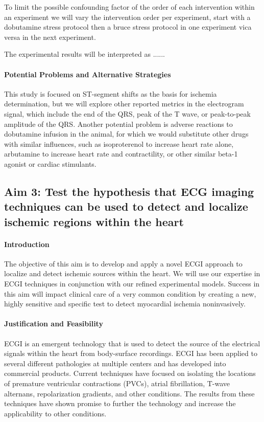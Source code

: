 To limit the possible confounding factor of the order of each intervention within an experiment we will vary the intervention order per experiment, \ie{} start with a dobutamine stress protocol then a bruce stress protocol in one experiment vica versa in the next experiment. 

The experimental results will be interpreted as ...... 


\paragraph{Potential Problems and Alternative Strategies} This study is
focused on ST-segment shifts as the basis for ischemia determination, but
we will explore other reported metrics in the electrogram signal, which
include the end of the QRS, peak of the T wave, or peak-to-peak amplitude
of the QRS. Another potential problem is adverse reactions to dobutamine
infusion in the animal, for which we would substitute other drugs with
similar influences, such as isoproterenol to increase heart rate alone,
arbutamine to increase heart rate and contractility, or other similar
beta-1 agonist or cardiac stimulants.

\subsection{Aim 3: Test the hypothesis that ECG imaging techniques can be used to detect and localize ischemic regions within the heart}

 \paragraph{Introduction} The objective of this aim is to develop and apply a novel ECGI approach to
localize and detect ischemic sources within the heart. We will use our
expertise in ECGI techniques in conjunction with our refined experimental
models. Success in this aim will impact clinical care of a very common
condition by creating a new, highly sensitive and specific test to detect
myocardial ischemia noninvasively.

\paragraph{Justification and Feasibility}
 ECGI is an emergent technology that
 is used to detect the source of the electrical signals within the heart
 from body-surface recordings.
ECGI has been applied to several different pathologies at multiple centers
and has developed into commercial products. Current techniques have focused
on isolating the locations of premature ventricular contractions (PVCs), atrial
fibrillation, T-wave alternans, repolarization gradients, and other
conditions.\cite{BLZ:Pot2014,BLZ:Dub2015,BLZ:Wan2016a,RSM:Sha2015,BLZ:Wan2018}
The results from these techniques have shown promise to further the
technology and increase the applicability to other conditions.

